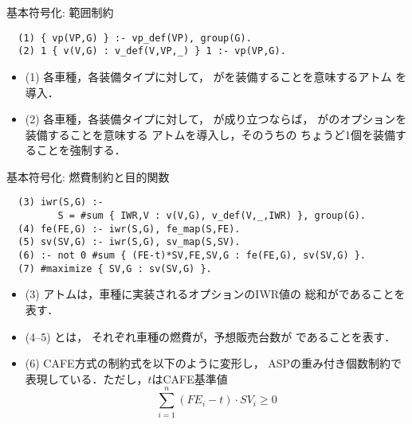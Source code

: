 \documentclass[dvipdfmx, 11pt]{beamer}
\begin{document}
\begin{frame}[fragile]{基本符号化: 範囲制約}
 \begin{center} 
 \end{center}

\vfill
\begin{exampleblock}{}
\begin{lstlisting}
  (1) { vp(VP,G) } :- vp_def(VP), group(G). 
  (2) 1 { v(V,G) : v_def(V,VP,_) } 1 :- vp(VP,G).
\end{lstlisting}
\end{exampleblock}
\vfill
\begin{itemize}
\item (1)
  各車種，各装備タイプに対して，
  がを装備することを意味するアトム
  を導入．
\item (2)
  各車種，各装備タイプに対して，
  が成り立つならば，
  がのオプションを装備することを意味する
  アトムを導入し，そのうちの
  ちょうど1個を装備することを強制する．
\end{itemize}
\end{frame}
\begin{frame}[fragile]{基本符号化: 燃費制約と目的関数}
\begin{exampleblock}{}\small
\begin{lstlisting}
  (3) iwr(S,G) :- 
         S = #sum { IWR,V : v(V,G), v_def(V,_,IWR) }, group(G).
  (4) fe(FE,G) :- iwr(S,G), fe_map(S,FE).
  (5) sv(SV,G) :- iwr(S,G), sv_map(S,SV).
  (6) :- not 0 #sum { (FE-t)*SV,FE,SV,G : fe(FE,G), sv(SV,G) }.
  (7) #maximize { SV,G : sv(SV,G) }.
\end{lstlisting}
\end{exampleblock}
\vfill
\begin{itemize}
\item (3)
  アトムは，車種に実装されるオプションのIWR値の
  総和がであることを表す．
\item (4--5)
  とは，
  それぞれ車種の燃費が，予想販売台数が
  であることを表す．
\item (6)
  CAFE方式の制約式を以下のように変形し，
  ASPの重み付き個数制約で表現している．ただし，$t$はCAFE基準値
  \[\sum_{i=1}^{n} (FE_{i}-t)\cdot SV_{i} \geq 0\]
\end{itemize}
\end{frame}
\end{document}
